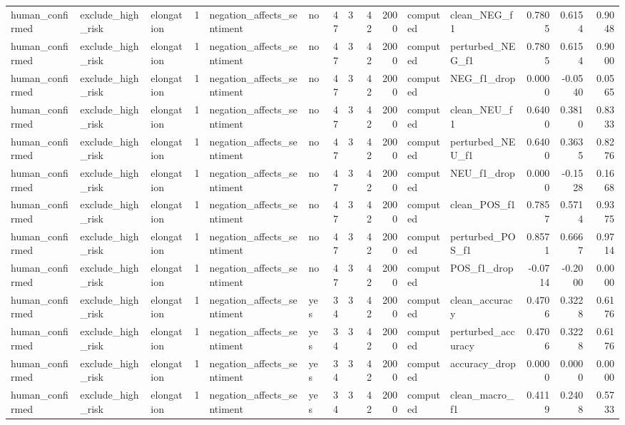 \begin{tabular}{lllrllrrrrllrrr}
human_confirmed & exclude_high_risk & elongation & 1 & negation_affects_sentiment & no & 47 & 3 & 42 & 2000 & computed & clean_NEG_f1 & 0.7805 & 0.6154 & 0.9048 \\
human_confirmed & exclude_high_risk & elongation & 1 & negation_affects_sentiment & no & 47 & 3 & 42 & 2000 & computed & perturbed_NEG_f1 & 0.7805 & 0.6154 & 0.9000 \\
human_confirmed & exclude_high_risk & elongation & 1 & negation_affects_sentiment & no & 47 & 3 & 42 & 2000 & computed & NEG_f1_drop & 0.0000 & -0.0540 & 0.0565 \\
human_confirmed & exclude_high_risk & elongation & 1 & negation_affects_sentiment & no & 47 & 3 & 42 & 2000 & computed & clean_NEU_f1 & 0.6400 & 0.3810 & 0.8333 \\
human_confirmed & exclude_high_risk & elongation & 1 & negation_affects_sentiment & no & 47 & 3 & 42 & 2000 & computed & perturbed_NEU_f1 & 0.6400 & 0.3635 & 0.8276 \\
human_confirmed & exclude_high_risk & elongation & 1 & negation_affects_sentiment & no & 47 & 3 & 42 & 2000 & computed & NEU_f1_drop & 0.0000 & -0.1528 & 0.1668 \\
human_confirmed & exclude_high_risk & elongation & 1 & negation_affects_sentiment & no & 47 & 3 & 42 & 2000 & computed & clean_POS_f1 & 0.7857 & 0.5714 & 0.9375 \\
human_confirmed & exclude_high_risk & elongation & 1 & negation_affects_sentiment & no & 47 & 3 & 42 & 2000 & computed & perturbed_POS_f1 & 0.8571 & 0.6667 & 0.9714 \\
human_confirmed & exclude_high_risk & elongation & 1 & negation_affects_sentiment & no & 47 & 3 & 42 & 2000 & computed & POS_f1_drop & -0.0714 & -0.2000 & 0.0000 \\
human_confirmed & exclude_high_risk & elongation & 1 & negation_affects_sentiment & yes & 34 & 3 & 42 & 2000 & computed & clean_accuracy & 0.4706 & 0.3228 & 0.6176 \\
human_confirmed & exclude_high_risk & elongation & 1 & negation_affects_sentiment & yes & 34 & 3 & 42 & 2000 & computed & perturbed_accuracy & 0.4706 & 0.3228 & 0.6176 \\
human_confirmed & exclude_high_risk & elongation & 1 & negation_affects_sentiment & yes & 34 & 3 & 42 & 2000 & computed & accuracy_drop & 0.0000 & 0.0000 & 0.0000 \\
human_confirmed & exclude_high_risk & elongation & 1 & negation_affects_sentiment & yes & 34 & 3 & 42 & 2000 & computed & clean_macro_f1 & 0.4119 & 0.2408 & 0.5733 \\

\end{tabular}
